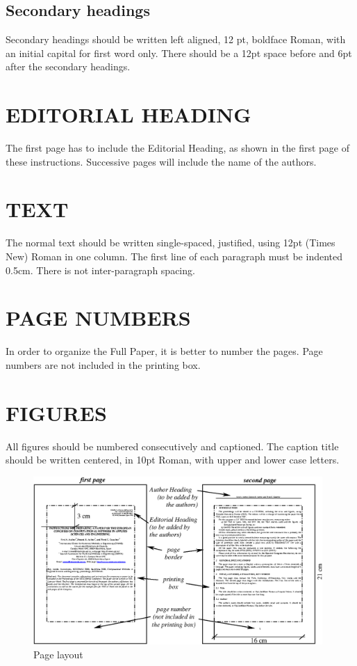 \documentclass{coupled}
\begin{document}
\subsection {Secondary headings}

Secondary headings should be written left aligned, 12 pt, boldface
Roman, with an initial capital for first word only. There should
be a 12pt space before and 6pt after the secondary headings.

\section{EDITORIAL HEADING}

The first page has to include the Editorial Heading, as shown in
the first page of these instructions. Successive pages will
include the name of the authors.

\section{TEXT}

The normal text should be written single-spaced, justified, using
12pt (Times New) Roman in one column. The first line of each
paragraph must be indented 0.5cm. There is not inter-paragraph
spacing.

\section{PAGE NUMBERS}

In order to organize the Full Paper, it is better to number
the pages. Page numbers are not included in the printing box.

\section{FIGURES}

All figures should be numbered consecutively and captioned. The
caption title should be written centered, in 10pt Roman, with
upper and lower case letters.

\begin{figure}[t]
\centering
\includegraphics[width=11cm]{firstpage}
\caption{Page layout}
\end{figure}
\end{document}
